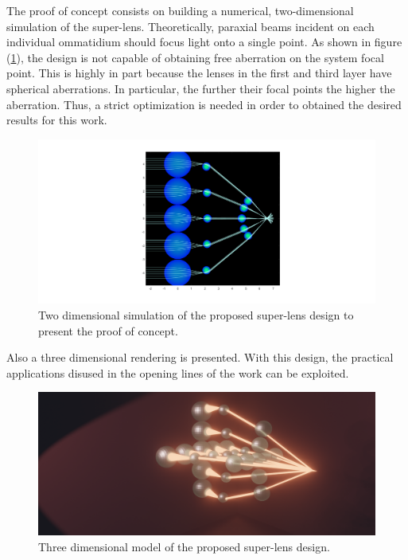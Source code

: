 The proof of concept consists on building a numerical, two-dimensional simulation of the super-lens. Theoretically, paraxial beams incident on each individual ommatidium should focus light onto a single point. As shown in figure (\ref{fig:Superlens POC}), the design is not capable of obtaining free aberration on the system focal point. This is highly in part because the lenses in the first and third layer have spherical aberrations. In particular, the further their focal points the higher the aberration. Thus, a strict optimization is needed in order to obtained the desired results for this work. \\

\begin{figure}[H]
    \centering
    \includegraphics[scale=0.2]{Figures/MYSuperplens_POC.png}
    \caption{Two dimensional simulation of the proposed super-lens design to present the proof of concept.}
    \label{fig:Superlens POC}
\end{figure}


Also a three dimensional rendering is presented. With this design, the practical applications disused in the opening lines of the work can be exploited. 

\begin{figure}[H]
    \centering
    \includegraphics[scale=0.19]{Figures/Side-front-superlens.png}
    \caption{Three dimensional model of the proposed super-lens design.}
    \label{fig:Superlens design}
\end{figure}